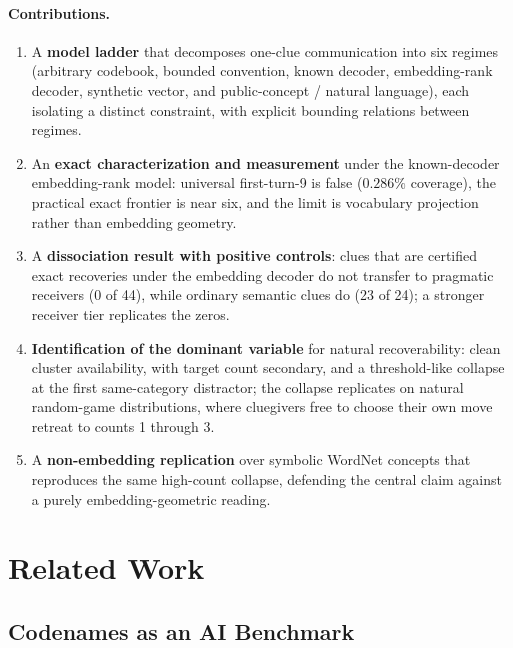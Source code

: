 \documentclass[11pt]{article}
\begin{document}
\paragraph{Contributions.}
\begin{enumerate}
  \item A \textbf{model ladder} that decomposes one-clue communication into six
    regimes (arbitrary codebook, bounded convention, known decoder,
    embedding-rank decoder, synthetic vector, and public-concept / natural
    language), each isolating a distinct constraint, with explicit bounding
    relations between regimes.
  \item An \textbf{exact characterization and measurement} under the
    known-decoder embedding-rank model: universal first-turn-9 is false
    ($0.286\%$ coverage), the practical exact frontier is near six, and the
    limit is vocabulary projection rather than embedding geometry.
  \item A \textbf{dissociation result with positive controls}: clues that are
    certified exact recoveries under the embedding decoder do not transfer to
    pragmatic receivers (0 of 44), while ordinary semantic clues do (23 of 24);
    a stronger receiver tier replicates the zeros.
  \item \textbf{Identification of the dominant variable} for natural
    recoverability: clean cluster availability, with target count secondary, and
    a threshold-like collapse at the first same-category distractor; the collapse
    replicates on natural random-game distributions, where cluegivers free to
    choose their own move retreat to counts 1 through 3.
  \item A \textbf{non-embedding replication} over symbolic WordNet concepts that
    reproduces the same high-count collapse, defending the central claim against
    a purely embedding-geometric reading.
\end{enumerate}

\section{Related Work}\label{sec:related}

\subsection{Codenames as an AI Benchmark}
\end{document}
